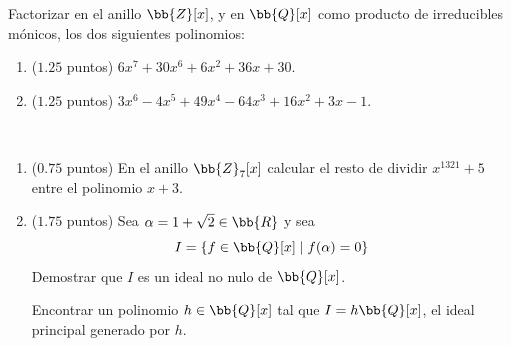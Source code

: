 \documentclass[12pt]{article}
\begin{document}
    \begin{ejercicio}[$2.5$ puntos]
        Factorizar en el anillo $\bb{Z}[x]$, y en $\bb{Q}[x]$ como producto de irreducibles mónicos, los dos siguientes polinomios:
        \begin{enumerate}[label=\arabic*.]
            \item ($1.25$ puntos) $6x^7 + 30x^6 + 6x^2 + 36x + 30$.
            \item ($1.25$ puntos) $3x^6 - 4x^5 + 49x^4 - 64x^3 + 16x^2 + 3x - 1$.
        \end{enumerate}
    \end{ejercicio}

    \begin{ejercicio}[$2.5$ puntos]~
        \begin{enumerate}[label=\arabic*.]
            \item ($0.75$ puntos) En el anillo $\bb{Z}_7[x]$ calcular el resto de dividir $x^{1321} + 5$ entre el polinomio $x + 3$.
            \item ($1.75$ puntos) Sea $\alpha = 1 + \sqrt{2} \in \bb{R}$ y sea
            \[
            I = \{ f \in \bb{Q}[x] \mid f(\alpha) = 0 \}
            \]
            Demostrar que $I$ es un ideal no nulo de $\bb{Q}[x]$.
            
            Encontrar un polinomio $h \in \bb{Q}[x]$ tal que $I = h\bb{Q}[x]$, el ideal principal generado por $h$.
        \end{enumerate}
    \end{ejercicio}

\end{document}
